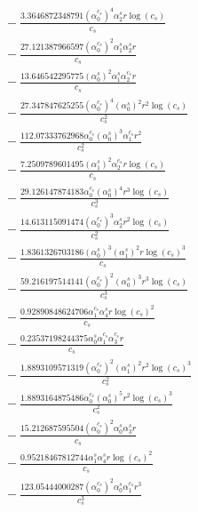 \documentclass[10pt]{article}
\begin{document}
\begin{align*}
&{}  - \frac{3.3646872348791 \left(\alpha_{0}^{c_s}\right)^{4} \alpha_{2}^s r \log{\left(c_{s} \right)}}{c_{s}} \\
&{}  - \frac{27.121387966597 \left(\alpha_{0}^{c_s}\right)^{2} \alpha_{1}^s \alpha_{2}^s r}{c_{s}} \\
&{}  - \frac{13.646542295775 \left(\alpha_{0}^s\right)^{2} \alpha_{1}^s \alpha_{2}^{c_s} r}{c_{s}} \\
&{}  - \frac{27.347847625255 \left(\alpha_{0}^{c_s}\right)^{4} \left(\alpha_{0}^s\right)^{2} r^{2} \log{\left(c_{s} \right)}}{c_{s}^{2}} \\
&{}  - \frac{112.07333762968 \alpha_{0}^{c_s} \left(\alpha_{0}^s\right)^{3} \alpha_{1}^{c_s} r^{2}}{c_{s}^{2}} \\
&{}  - \frac{7.2509789601495 \left(\alpha_{1}^s\right)^{2} \alpha_{2}^{c_s} r \log{\left(c_{s} \right)}}{c_{s}} \\
&{}  - \frac{29.126147874183 \alpha_{0}^{c_s} \left(\alpha_{0}^s\right)^{4} r^{3} \log{\left(c_{s} \right)}}{c_{s}^{3}} \\
&{}  - \frac{14.613115091474 \left(\alpha_{0}^{c_s}\right)^{3} \alpha_{2}^s r^{2} \log{\left(c_{s} \right)}}{c_{s}^{2}} \\
&{}  - \frac{1.8361326703186 \left(\alpha_{0}^s\right)^{3} \left(\alpha_{1}^s\right)^{2} r \log{\left(c_{s} \right)}^{3}}{c_{s}} \\
&{}  - \frac{59.216197514141 \left(\alpha_{0}^{c_s}\right)^{2} \left(\alpha_{0}^s\right)^{3} r^{3} \log{\left(c_{s} \right)}}{c_{s}^{3}} \\
&{}  - \frac{0.92890848624706 \alpha_{1}^{c_s} \alpha_{4}^s r \log{\left(c_{s} \right)}^{2}}{c_{s}} \\
&{}  - \frac{0.23537198244375 \alpha_{0}^s \alpha_{1}^{c_s} \alpha_{3}^{c_s} r}{c_{s}} \\
&{}  - \frac{1.8893109571319 \left(\alpha_{0}^{c_s}\right)^{2} \left(\alpha_{1}^s\right)^{2} r^{2} \log{\left(c_{s} \right)}^{3}}{c_{s}^{2}} \\
&{}  - \frac{1.8893164875486 \alpha_{0}^{c_s} \left(\alpha_{0}^s\right)^{5} r^{2} \log{\left(c_{s} \right)}^{3}}{c_{s}^{2}} \\
&{}  - \frac{15.212687595504 \left(\alpha_{0}^{c_s}\right)^{2} \alpha_{0}^s \alpha_{3}^s r}{c_{s}} \\
&{}  - \frac{0.95218467812744 \alpha_{1}^s \alpha_{4}^s r \log{\left(c_{s} \right)}^{2}}{c_{s}} \\
&{}  - \frac{123.05444000287 \left(\alpha_{0}^{c_s}\right)^{2} \alpha_{0}^s \alpha_{1}^{c_s} r^{3}}{c_{s}^{3}} \\

\end{align*}
\end{document}
